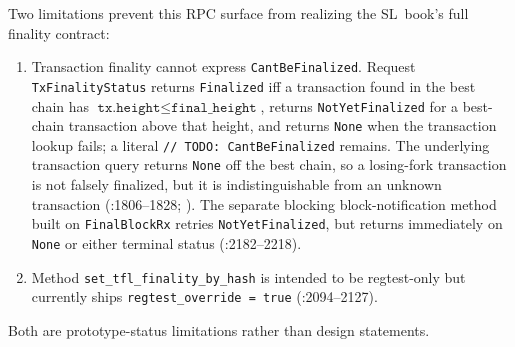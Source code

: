 \documentclass[11pt,a4paper]{article}
\theoremstyle{definition}
\begin{document}
Two limitations prevent this RPC surface from realizing the SL~book's
full finality contract:
\begin{enumerate}[label=(\roman*)]
\item Transaction finality cannot express \texttt{CantBeFinalized}.
  Request \texttt{TxFinalityStatus} returns \texttt{Finalized} iff a
  transaction found in the best chain has
  $\texttt{tx.height} \le \texttt{final\_height}$, returns
  \texttt{NotYetFinalized} for a best-chain transaction above that height,
  and returns \texttt{None} when the transaction lookup fails; a literal
  \texttt{// TODO: CantBeFinalized} remains. The underlying transaction
  query returns \texttt{None} off the best chain, so a losing-fork
  transaction is not falsely finalized, but it is indistinguishable from
  an unknown transaction
  (:1806--1828;
  ). The separate blocking
  block-notification method built on \texttt{FinalBlockRx} retries
  \texttt{NotYetFinalized}, but returns immediately on \texttt{None}
  or either terminal status
  (:2182--2218).
\item Method \texttt{set\_tfl\_finality\_by\_hash} is intended to be
  regtest-only but currently ships \texttt{regtest\_override = true}
  (:2094--2127).
\end{enumerate}
Both are prototype-status limitations rather than design statements.
\end{document}
